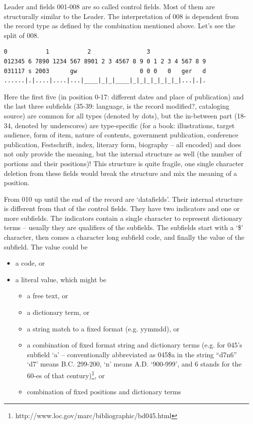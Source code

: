 Leader and fields 001-008 are so called control fields. Most of them are structurally similar to the Leader. The interpretation of 008 is dependent from the record type as defined by the combination mentioned above. Let's see the split of 008.

\begin{small}
\begin{Verbatim}[samepage=true]
0           1           2                3  
012345 6 7890 1234 567 8901 2 3 4567 8 9 0 1 2 3 4 567 8 9
031117 s 2003      gw                  0 0 0   0   ger   d
......|.|....|....|...|____|_|_|____|_|_|_|_|_|_|_|...|.|.
\end{Verbatim}
\end{small}

Here the first five (in position 0-17: different dates and place of publication) and the last three subfields (35-39: language, is the record modified?, cataloging source) are common for all types (denoted by dots), but the in-between part (18-34, denoted by underscores) are type-specific (for a book: illustrations, target audience, form of item, nature of contents, government publication, conference publication, Festschrift, index, literary form, biography -- all encoded) and does not only provide the meaning, but the internal structure as well (the number of portions and their positions)! This structure is quite fragile, one single character deletion from these fields would break the structure and mix the meaning of a position.

From 010 up until the end of the record are `datafields'. Their internal structure is different from that of the control fields. They have two indicators and one or more subfields. The indicators contain a single character to represent dictionary terms -- usually they are qualifiers of the subfields. The subfields start with a `\$' character, then comes a character long subfield code, and finally the value of the subfield. The value could be

\begin{itemize}
 \setlength{\parskip}{0pt}
 \setlength{\itemsep}{0pt plus 1pt}
 \item a code, or
 \item a literal value, which might be
 \begin{itemize}
  \setlength{\parskip}{0pt}
  \setlength{\itemsep}{0pt plus 1pt}
  \item a free text, or
  \item a dictionary term, or
  \item a string match to a fixed format (e.g. yymmdd), or
  \item a combination of fixed format string and dictionary terms (e.g. for 045's subfield `a' -- conventionally abbreviated as 045\$a in the string ``d7n6'' `d7' means B.C. 299-200, `n' means A.D. `900-999', and 6 stands for the 60-es of that century)\footnote{http://www.loc.gov/marc/bibliographic/bd045.html}, or
  \item combination of fixed positions and dictionary terms
 \end{itemize}
\end{itemize}


